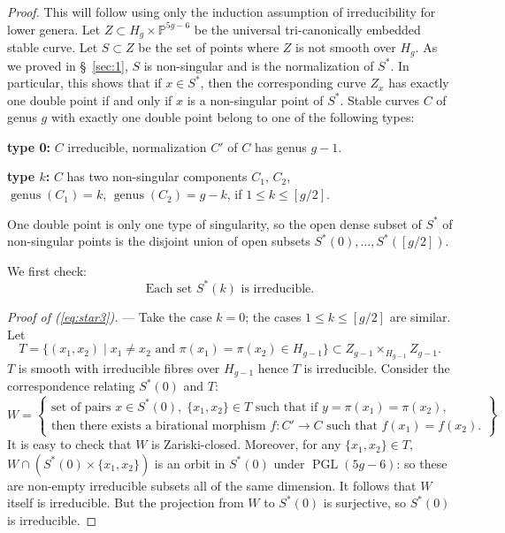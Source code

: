 \documentclass[10pt]{amsart}
\theoremstyle{plain}
\theoremstyle{definition}
\DeclareMathOperator{\PGL}{PGL}
\DeclareMathOperator{\genus}{genus}
\begin{document}
\begin{proof}
This will follow using only the induction assumption of irreducibility for lower genera. Let $Z \subset H_g \times \mathbb{P}^{5g-6}$ be the universal tri-canonically embedded stable curve. Let $S \subset Z$ be the set of points where $Z$ is not smooth over $H_g$. As we proved in \S~\ref{sec:1}, $S$ is non-singular and is the normalization of $S^*$. In particular, this shows that if $x \in S^*$, then the corresponding curve $Z_x$ has exactly one double point if and only if $x$ is a non-singular point of $S^*$. Stable curves $C$ of genus $g$ with exactly one double point belong to one of the following types:

\begin{center}
\textbf{type 0:} \quad $C$ irreducible, normalization $C'$ of $C$ has genus $g-1$.

\textbf{type $k$:} \quad $C$ has two non-singular components $C_1$, $C_2$, \\
$\genus(C_1) = k$, $\genus(C_2) = g - k$, if $1 \leq k \leq [g/2]$.
\end{center}

One double point is only one type of singularity, so the open dense subset of $S^*$ of non-singular points is the disjoint union of open subsets $S^*(0), \ldots, S^*([g/2])$.

We first check:
\begin{equation}\tag{$*$}\label{eq:star3}
\text{Each set } S^*(k) \text{ is irreducible.}
\end{equation}

\textit{Proof of (\ref{eq:star3}).} --- Take the case $k = 0$; the cases $1 \leq k \leq [g/2]$ are similar. Let
\[
T = \{(x_1, x_2) \mid x_1 \neq x_2 \text{ and } \pi(x_1) = \pi(x_2) \in H_{g-1}\} \subset Z_{g-1} \times_{H_{g-1}} Z_{g-1}.
\]
$T$ is smooth with irreducible fibres over $H_{g-1}$ hence $T$ is irreducible. Consider the correspondence relating $S^*(0)$ and $T$:
\[
W = \left\{\begin{array}{c} \text{set of pairs } x \in S^*(0), \; \{x_1, x_2\} \in T \text{ such that if } y = \pi(x_1) = \pi(x_2), \\ \text{then there exists a birational morphism } f: C' \to C \text{ such that } f(x_1) = f(x_2). \end{array}\right\}
\]
It is easy to check that $W$ is Zariski-closed. Moreover, for any $\{x_1, x_2\} \in T$, $W \cap (S^*(0) \times \{x_1, x_2\})$ is an orbit in $S^*(0)$ under $\PGL(5g-6)$: so these are non-empty irreducible subsets all of the same dimension. It follows that $W$ itself is irreducible. But the projection from $W$ to $S^*(0)$ is surjective, so $S^*(0)$ is irreducible.


\end{proof}
\end{document}
